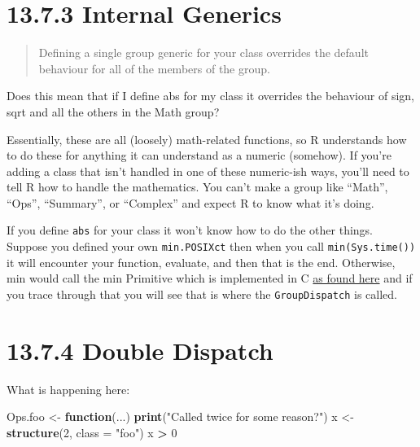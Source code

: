\documentclass[]{book}
\newenvironment{Shaded}{\begin{snugshade}}{\end{snugshade}}
\newcommand{\ControlFlowTok}[1]{\textcolor[rgb]{0.13,0.29,0.53}{\textbf{#1}}}
\newcommand{\DataTypeTok}[1]{\textcolor[rgb]{0.13,0.29,0.53}{#1}}
\newcommand{\DecValTok}[1]{\textcolor[rgb]{0.00,0.00,0.81}{#1}}
\newcommand{\KeywordTok}[1]{\textcolor[rgb]{0.13,0.29,0.53}{\textbf{#1}}}
\newcommand{\NormalTok}[1]{#1}
\newcommand{\OperatorTok}[1]{\textcolor[rgb]{0.81,0.36,0.00}{\textbf{#1}}}
\newcommand{\StringTok}[1]{\textcolor[rgb]{0.31,0.60,0.02}{#1}}
\begin{document}
\hypertarget{internal-generics}{%
\section*{13.7.3 Internal Generics}\label{internal-generics}}

\begin{quote}
Defining a single group generic for your class overrides the default behaviour for all of the members of the group.
\end{quote}

Does this mean that if I define abs for my class it overrides the behaviour of sign, sqrt and all the others in the Math group?

Essentially, these are all (loosely) math-related functions, so R understands how to do these for anything it can understand as a numeric (somehow). If you're adding a class that isn't handled in one of these numeric-ish ways, you'll need to tell R how to handle the mathematics. You can't make a group like ``Math'', ``Ops'', ``Summary'', or ``Complex'' and expect R to know what it's doing.

If you define \texttt{abs} for your class it won't know how to do the other things. Suppose you defined your own \texttt{min.POSIXct} then when you call \texttt{min(Sys.time())} it will encounter your function, evaluate, and then that is the end. Otherwise, min would call the min Primitive which is implemented in C \href{https://github.com/wch/r-source/blob/bf4cf8912596162a3ae5a2b7da1a74220105b172/src/main/summary.c\#L520}{as found here} and if you trace through that you will see that is where the \texttt{GroupDispatch} is called.

\hypertarget{double-dispatch}{%
\section*{13.7.4 Double Dispatch}\label{double-dispatch}}

What is happening here:

\begin{Shaded}
\begin{Highlighting}[]
\NormalTok{Ops.foo <-}\StringTok{ }\ControlFlowTok{function}\NormalTok{(...)  }\KeywordTok{print}\NormalTok{(}\StringTok{"Called twice for some reason?"}\NormalTok{)}
\NormalTok{x <-}\StringTok{ }\KeywordTok{structure}\NormalTok{(}\DecValTok{2}\NormalTok{, }\DataTypeTok{class =} \StringTok{"foo"}\NormalTok{)}
\NormalTok{x }\OperatorTok{>}\StringTok{ }\DecValTok{0}
\end{Highlighting}
\end{Shaded}
\end{document}
